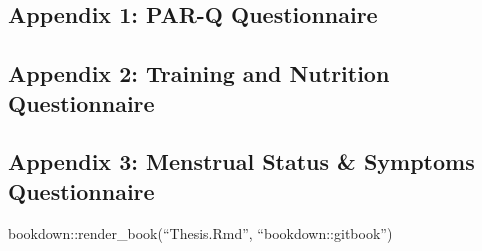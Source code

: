 \documentclass[
]{article}
\begin{document}
\appendix


\subsection{Appendix 1: PAR-Q Questionnaire}\label{appendix-parq}

\subsection{Appendix 2: Training and Nutrition Questionnaire}\label{appendix-training}

\subsection{Appendix 3: Menstrual Status \& Symptoms Questionnaire}\label{appendix-menstrualq}



bookdown::render\_book(``Thesis.Rmd'', ``bookdown::gitbook'')
\end{document}
